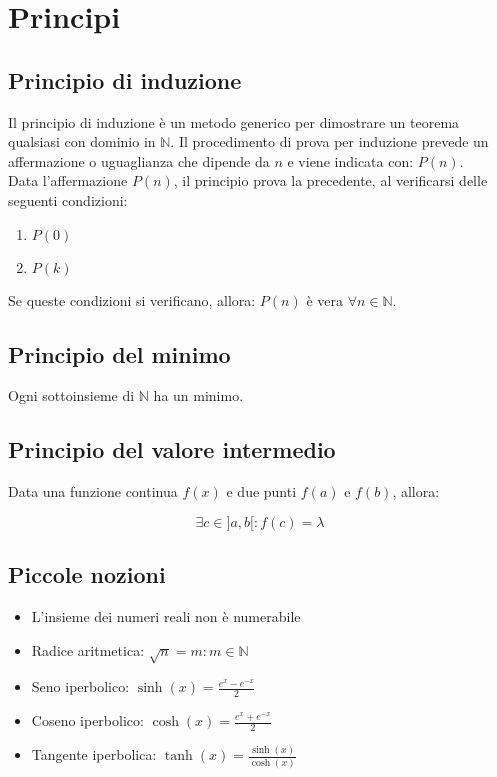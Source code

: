 \documentclass{subfiles}
\begin{document}
\section{Principi}

\subsection{Principio di induzione}

Il principio di induzione è un metodo generico per dimostrare un teorema qualsiasi con dominio in $\mathbb{N}$.
Il procedimento di prova per induzione prevede un affermazione o uguaglianza che dipende da $n$ e viene indicata con: $P(n)$.\\

\noindent
Data l'affermazione $P(n)$, il principio prova la precedente, al verificarsi delle seguenti condizioni:

\begin{enumerate}
    \item $P(0)$
    \item $P(k)$
\end{enumerate}

\noindent
Se queste condizioni si verificano, allora: $P(n)$ è vera $\forall n \in \mathbb{N}$.

\subsection{Principio del minimo}

Ogni sottoinsieme di $\mathbb{N}$ ha un minimo.

\subsection{Principio del valore intermedio}

Data una funzione continua $f(x)$ e due punti $f(a)$ e $f(b)$, allora:

$$
\exists c \in ] a, b [ : f(c) = \lambda
$$

\subsection{Piccole nozioni}

\begin{itemize}
    \item L'insieme dei numeri reali non è numerabile
    \item Radice aritmetica: $\sqrt{n} = m : m \in \mathbb{N}$
    \item Seno iperbolico: $\sinh(x) = \frac{e^x - e^{-x}}{2}$
    \item Coseno iperbolico: $\cosh(x) = \frac{e^x + e^{-x}}{2}$
    \item Tangente iperbolica: $\tanh(x) = \frac{\sinh(x)}{\cosh(x)}$
\end{itemize}
\end{document}
